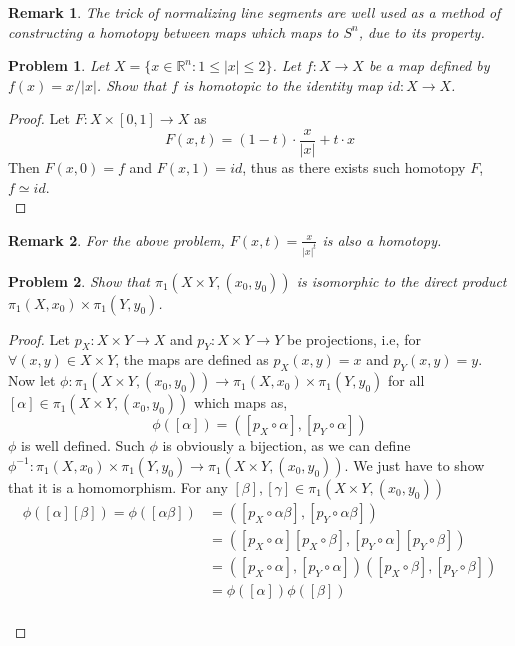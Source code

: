 \documentclass[paper=a4, fontsize=11pt]{scrartcl}
\newtheorem*{remark}{Remark}
\newtheorem{problem}{Problem}
\begin{document}
\begin{remark}
	The trick of normalizing line segments are well used as a method of constructing a homotopy between maps which maps to $S^n$, due to its property.\\
\end{remark}

\begin{problem}
	Let $X=\{x\in \mathbb{R}^n:1\leq |x| \leq 2\}$. Let $f:X\to X$ be a map defined by $f(x)=x/|x|$. Show that $f$ is homotopic to the identity map $id:X\to X$.\\
\end{problem}

\begin{proof}
	Let $F:X\times [0,1] \to X$ as 
	\begin{equation}\nonumber
		F(x,t) = (1-t) \cdot \frac{x}{|x|} + t \cdot x
	\end{equation}
	Then $F(x,0)=f$ and $F(x,1)=id$, thus as there exists such homotopy $F$, $f \simeq id$.\\
\end{proof}

\begin{remark}
	For the above problem, $F(x,t)=\frac{x}{|x|^t}$ is also a homotopy.\\
\end{remark}

\begin{problem}
	Show that $\pi_1(X\times Y,(x_0,y_0))$ is isomorphic to the direct product $\pi_1(X,x_0)\times\pi_1(Y,y_0)$.\\
\end{problem}

\begin{proof}
	Let $p_X:X\times Y \to X$ and $p_Y:X \times Y \to Y$ be projections, i.e, for $\forall (x,y) \in X\times Y$, the maps are defined as $p_X(x,y)=x$ and $p_Y(x,y)=y$. Now let $\phi : \pi_1(X\times Y,(x_0,y_0)) \to \pi_1(X,x_0)\times\pi_1(Y,y_0)$ for all $[\alpha] \in \pi_1(X\times Y,(x_0,y_0))$ which maps as,
	\begin{equation}\nonumber
		\phi([\alpha]) = ([p_X \circ \alpha],[p_Y \circ \alpha])
	\end{equation}
	$\phi$ is well defined.
	Such $\phi$ is obviously a bijection, as we can define $\phi^{-1}:\pi_1(X,x_0)\times\pi_1(Y,y_0) \to \pi_1(X\times Y,(x_0,y_0))$. We just have to show that it is a homomorphism. For any $[\beta],[\gamma]\in\pi_1(X\times Y,(x_0,y_0))$  \\
	\begin{equation}\nonumber
		\begin{split}
			\phi([\alpha][\beta]) = \phi([\alpha\beta]) &= ([p_X \circ \alpha \beta] ,[p_Y \circ \alpha \beta]) \\
			&= ([p_X \circ \alpha][p_X \circ \beta],[p_Y \circ \alpha][p_Y \circ \beta]) \\
			&= ([p_X \circ \alpha],[p_Y \circ \alpha])([p_X \circ \beta],[p_Y \circ \beta]) \\
			&= \phi([\alpha]) \phi([\beta])			
		\end{split}
	\end{equation}\\
\end{proof}
\end{document}
